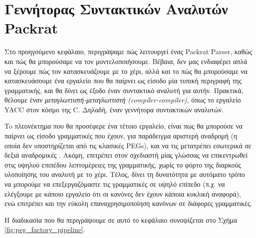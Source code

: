 \documentclass[diploma]{softlab-thesis}
\begin{document}
\chapter{ Γεννήτορας Συντακτικών Αναλυτών Packrat }

Στο προηγούμενο κεφάλαιο, περιγράψαμε πώς λειτουργεί ένας Packrat Parser, καθώς και πώς θα μπορούσαμε να τον μοντελοποιήσουμε. 
Βέβαια, δεν μας ενδιαφέρει απλά να ξέρουμε πώς τον κατασκευάζουμε με το χέρι, αλλά και το πώς θα μπορούσαμε να κατασκευάσουμε ένα εργαλείο που θα παίρνει ως είσοδο μία τυπική περιγραφή της γραμματικής, και θα δίνει ως έξοδο έναν συντακτικό αναλυτή για αυτήν.
Πρακτικά, θέλουμε έναν \textit{μεταγλωττιστή-μεταγλωττιστή (compiler-compiler)}, όπως το εργαλείο YACC στον κόσμο της C. Δηλαδή, έναν γεννήτορα συντακτικών αναλυτών.

To πλεονέκτημα που θα προσέφερε ένα τέτοιο εργαλείο, είναι πως θα μπορούσε να παίρνει ως είσοδο γραμματικές που έχουν, για παράδειγμα αριστερή αναδρομή (η οποία δεν υποστηρίζεται από τις κλασικές PEGs), και να τις μετατρέπει εσωτερικά σε δεξιά αναδρομικές \cite{Ford2002a}.
Ακόμη, επιτρέπει στον σχεδιαστή μίας γλώσσας να επικεντρωθεί στις υψηλού επιπέδου λεπτομέρειες της γραμματικής, χωρίς το φόρτο της διαρκούς υλοποίησης του αναλυτή με το χέρι. 
Τέλος, δίνει τη δυνατότητα με αυτόματο τρόπο να μπορούμε να επεξεργαζόμαστε τις γραμματικές σε υψηλό επίπεδο (π.χ. να ελέγξουμε με κάποιο εργαλείο ότι οι κανόνες δεν έχουν κάποια κυκλική αναφορά), ενώ επιτρέπει και την εύκολη επαναχρησιμοποίηση κανόνων σε διάφορες γραμματικές.

Η διαδικασία που θα περιγράψουμε σε αυτό το κεφάλαιο συνοψίζεται στο Σχήμα \ref{fig:peg_factory_pipeline}.
\end{document}
